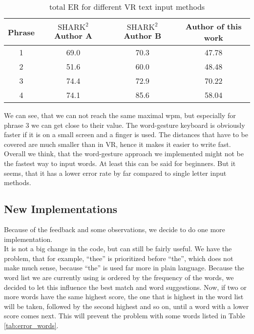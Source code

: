 \begin{table}[H]
    \centering
    \caption{total ER for different VR text input methods}
    \begin{tabular}{cccc} \toprule
        Phrase&$\text{SHARK}^2$ Author A&$\text{SHARK}^2$ Author B&Author of this work\\ \midrule
        1&69.0&70.3&47.78\\
        2&51.6&60.0&48.48\\
        3&74.4&72.9&70.22\\
        4&74.1&85.6&58.04\\
        \bottomrule
    \end{tabular}
    \label{tab:top speed}
\end{table}
We can see, that we can not reach the same maximal wpm, but especially for phrase 3 we can get close to their value. The word-gesture keyboard is obviously faster if it is on a small screen and a finger is used. The distances that have to be covered are much smaller than in VR, hence it makes it easier to write fast.\\

Overall we think, that the word-gesture approach we implemented might not be the fastest way to input words. At least this can be said for beginners. But it seems, that it has a lower error rate by far compared to single letter input methods.

\subsection{New Implementations}
Because of the feedback and some observations, we decide to do one more implementation.\\
It is not a big change in the code, but can still be fairly useful. We have the problem, that for example, ``thee'' is prioritized before ``the'', which does not make much sense, because ``the'' is used far more in plain language. Because the word list we are currently using is ordered by the frequency of the words, we decided to let this influence the best match and word suggestions. Now, if two or more words have the same highest score, the one that is highest in the word list will be taken, followed by the second highest and so on, until a word with a lower score comes next. This will prevent the problem with some words listed in Table \ref{tab:error_words}.